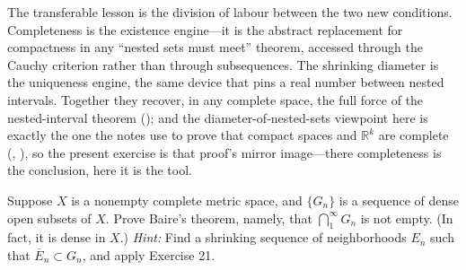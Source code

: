 \documentclass[main.tex]{subfiles}
\begin{document}
\begin{Reflection}
The transferable lesson is the division of labour between the two new conditions. Completeness is the
existence engine---it is the abstract replacement for compactness in any ``nested sets must meet''
theorem, accessed through the Cauchy criterion rather than through subsequences. The shrinking
diameter is the uniqueness engine, the same device that pins a real number between nested intervals.
Together they recover, in any complete space, the full force of the nested-interval theorem
(); and the diameter-of-nested-sets viewpoint here is exactly the one the notes use to
prove that compact spaces and $\mathbb R^k$ are complete (, ), so the present
exercise is that proof's mirror image---there completeness is the conclusion, here it is the tool.
\end{Reflection}

Suppose $X$ is a nonempty complete metric space, and $\{G_{n}\}$ is a sequence of dense open subsets of
$X$. Prove Baire's theorem, namely, that $\bigcap_{1}^{\infty} G_{n}$ is not empty. (In fact, it is dense
in $X$.) \textit{Hint:} Find a shrinking sequence of neighborhoods $E_{n}$ such that
$\overline{E}_{n} \subset G_{n}$, and apply Exercise 21.
\end{document}
